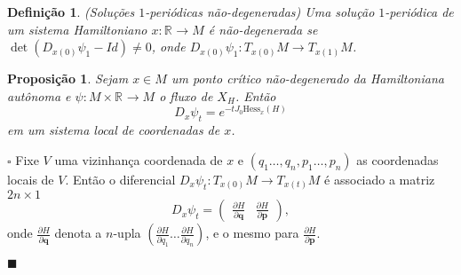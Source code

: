 \documentclass[12pt]{book}
\newtheorem{definicao}[teorema]{Definição}
\newtheorem{proposicao}[teorema]{Proposição}
\newenvironment{prova}[1]{$\square$ #1}{\hfill$\blacksquare$}
\newcommand{\campohamiltonianoabrev}{X_{H}}
\newcommand{\derivadaparcial}[2]{\frac{\partial #1}{\partial #2}}
\newcommand{\espacotangenteponto}[2]{T_{#1}#2}
\newcommand{\estruturacomplexa}{J_{0}}
\newcommand{\hessianaponto}[2]{\text{Hess}_{#1}(#2)}
\newcommand{\real}[1]{\mathbb{R}^{#1}}
\newcommand{\reta}{\real{}}
\begin{document}
	\begin{definicao}(Soluções $1$-periódicas não-degeneradas)
		Uma solução $1$-periódica de um sistema Hamiltoniano $x: \reta\to M$ é não-degenerada se $\det(D_{x(0)}\psi_{1} - Id)\neq 0$, onde $D_{x(0)}\psi_{1}:T_{x(0)}M \to T_{x(1)}M$.
	\end{definicao}
	
	\begin{proposicao}\label{proposicao_exponencial_hessiana}
		Sejam $x \in M$ um ponto crítico não-degenerado da Hamiltoniana autônoma e $\psi:M\times \reta\to M$ o fluxo de $\campohamiltonianoabrev$. Então 
		$$
		D_{x}\psi_{t} = e^{-t\estruturacomplexa \hessianaponto{x}{H}}
		$$
		em um sistema local de coordenadas de $x$.
	\end{proposicao}
	\begin{prova}
		Fixe $V$ uma vizinhança coordenada de $x$ e  $(q_{1}\dots, q_{n}, p_{1}\dots, p_{n})$ as coordenadas locais de $V$. Então o diferencial $D_{x}\psi_{t}:\espacotangenteponto{x(0)}{M} \to \espacotangenteponto{x(t)}{M}$ é associado a matriz $2n\times 1$
		$$
		D_{x}\psi_{t} = 
		\left(
		\begin{array}{cc}
		\derivadaparcial{H}{\textbf{q}} &\derivadaparcial{H}{\textbf{p}}
		\end{array}
		\right),
		$$
		onde $\derivadaparcial{H}{\textbf{q}}$ denota a $n$-upla $(	\derivadaparcial{H}{q_{1}} \dots \derivadaparcial{H}{q_{n}})$, e o mesmo para $\derivadaparcial{H}{\textbf{p}}$.
		

\end{prova}
\end{document}
